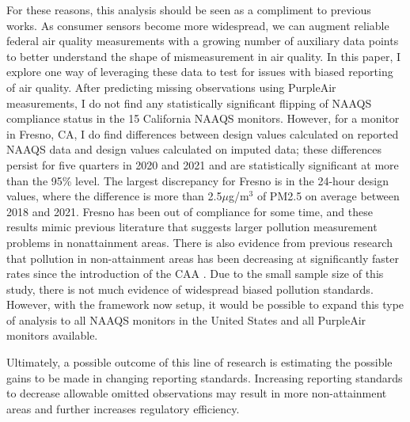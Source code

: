 For these reasons, this analysis should be seen as a compliment to previous works.
%
As consumer sensors become more widespread, we can augment reliable federal air quality measurements with a growing number of auxiliary data points to better understand the shape of mismeasurement in air quality.
%
In this paper, I explore one way of leveraging these data to test for issues with biased reporting of air quality.
%
After predicting missing observations using PurpleAir measurements, I do not find any statistically significant flipping of NAAQS compliance status in the 15 California NAAQS monitors. However, for a monitor in Fresno, CA, I do find differences between design values calculated on reported NAAQS data and design values calculated on imputed data; these differences persist for five quarters in 2020 and 2021 and are statistically significant at more than the 95\% level. 
%
The largest discrepancy for Fresno is in the 24-hour design values, where the difference is more than 2.5$\mu$g/m$^3$ of PM2.5 on average between 2018 and 2021. 
Fresno has been out of compliance for some time, and these results mimic previous literature that suggests larger pollution measurement problems in nonattainment areas.
%
There is also evidence from previous research that pollution in non-attainment areas has been decreasing at significantly faster rates since the introduction of the CAA \citep{currieWhatCausedRacial2020}.
%
Due to the small sample size of this study, there is not much evidence of widespread biased pollution standards. However, with the framework now setup, it would be possible to expand this type of analysis to all NAAQS monitors in the United States and all PurpleAir monitors available. 

Ultimately, a possible outcome of this line of research is estimating the possible gains to be made in changing reporting standards. Increasing reporting standards to decrease allowable omitted observations may result in more non-attainment areas and further increases regulatory efficiency. 








